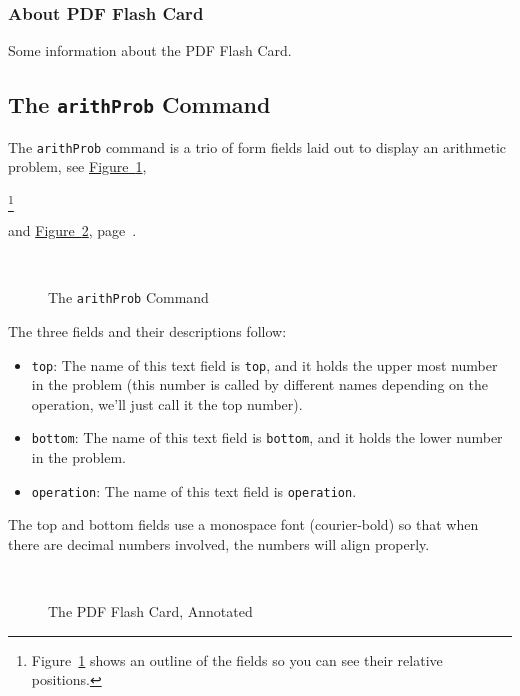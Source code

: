 \documentclass{article}
\makeatletter
\newcommand{\prodName}{\textsf{PDF Flash Card}}
\let\bslash=\@backslashchar
\def\cs#1{\texttt{\bslash#1}}
\makeatother
\begin{document}
\subsubsection{About PDF Flash Card}\label{aboutFC}

Some information about the {\prodName}.

\subsection{The \texorpdfstring{\protect\cs{arithProb}}
{} Command}

The \cs{arithProb} command is a trio of form fields laid out to display an
arithmetic problem, see
\hyperref[arithprob]{Figure~\ref*{arithprob}},\begin{NoHyper}\footnote{Figure~\ref*{arithprob}
shows an outline of the fields so you can see their relative
positions.}\end{NoHyper} and \hyperref[fcannot]{Figure~\ref*{fcannot}},
page~\pageref*{fcannot}.

\begin{figure}[htb]
\begin{center}\setlength{\fboxsep}{0pt}
\\
\caption{The \cs{arithProb} Command}\label{arithprob}
\end{center}
\end{figure}

The three fields and their descriptions follow:
\begin{itemize}
    \item \texttt{top}: The name of this text field is \texttt{top}, and it
        holds the upper most number in the problem (this number is called
        by different names depending on the operation, we'll just call it
        the top number).
    \item \texttt{bottom}: The name of this text field is \texttt{bottom},
        and it holds the lower number in the problem.
    \item \texttt{operation}: The name of this text field is
        \texttt{operation}.
\end{itemize}
The top and bottom fields use a monospace font (courier-bold) so that when
there are decimal numbers involved, the numbers will align properly.

\begin{figure}[htb]
\begin{center}\setlength{\fboxsep}{0pt}
\\
\caption{The \prodName, Annotated}\label{fcannot}
\end{center}
\end{figure}
\end{document}
